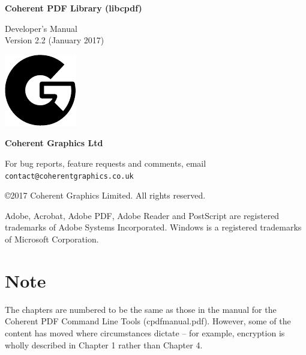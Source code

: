 \documentclass[a4paper]{memoir}
\newcommand{\smallgap}{\vspace{4mm}}
\begin{document}
\frontmatter
\thispagestyle{empty}

\begin{flushright}

{\sffamily \bfseries \Huge Coherent PDF Library (libcpdf)}

\vspace{12mm}

{\Huge Developer's Manual}\\\vspace{2mm}
Version 2.2 (January 2017)

\vspace{25mm}

\vfill

\includegraphics{logo.pdf}

\vspace{2mm}
{\sffamily \bfseries \LARGE Coherent Graphics Ltd}

\end{flushright}

\clearpage

\thispagestyle{empty}
\noindent For bug reports, feature requests and comments, email\\ \texttt{contact@coherentgraphics.co.uk}

\vspace*{\fill}
\noindent\copyright 2017 Coherent Graphics Limited. All rights reserved.

\smallgap 
\noindent Adobe, Acrobat, Adobe PDF, Adobe Reader and PostScript are
registered trademarks of Adobe Systems Incorporated. Windows is a registered trademarks of Microsoft Corporation.

\cleardoublepage
\tableofcontents

\cleardoublepage
\mainmatter
{}
\pagestyle{ruled}

\chapter*{Note}

The chapters are numbered to be the same as those in the manual for the Coherent PDF Command Line Tools (cpdfmanual.pdf). However, some of the content has moved where circumstances dictate -- for example, encryption is wholly described in Chapter 1 rather than Chapter 4.
\end{document}
